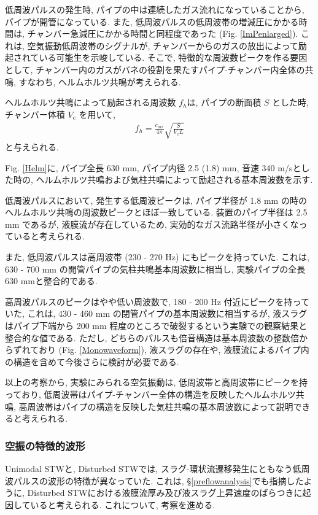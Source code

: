 \documentclass[12pt]{article}
\begin{document}
低周波パルスの発生時, パイプの中は連続したガス流れになっていることから, パイプが開管になっている.
また, 低周波パルスの低周波帯の増減圧にかかる時間は, チャンバー急減圧にかかる時間と同程度であった (Fig. \ref{ImPenlarged}). これは, 空気振動低周波帯のシグナルが, チャンバーからのガスの放出によって励起されている可能生を示唆している. そこで, 特徴的な周波数ピークを作る要因として, チャンバー内のガスがバネの役割を果たすパイプ-チャンバー内全体の共鳴, すなわち, ヘルムホルツ共鳴が考えられる.

ヘルムホルツ共鳴によって励起される周波数 $f_h$は, パイプの断面積 $S$ とした時, チャンバー体積 $V_\mathrm{c}$ を用いて,  
\begin{eqnarray}
f_{h}=\frac{c_{air}}{4\pi} \sqrt{  \frac{S}{V_\mathrm{c} L }   } \label{Helmeq}
\end{eqnarray}
と与えられる. 

Fig. \ref{Helm}に, パイプ全長 630 mm, パイプ内径 2.5 (1.8) mm, 音速 340 m/sとした時の, ヘルムホルツ共鳴および気柱共鳴によって励起される基本周波数を示す. 

低周波パルスにおいて, 発生する低周波ピークは, パイプ半径が 1.8 mm の時のヘルムホルツ共鳴の周波数ピークとほぼ一致している. 装置のパイプ半径は 2.5 mm であるが, 液膜流が存在しているため, 実効的なガス流路半径が小さくなっていると考えられる. 

また, 低周波パルスは高周波帯 (230 - 270 Hz) にもピークを持っていた. これは, 630 - 700 mm の開管パイプの気柱共鳴基本周波数に相当し, 実験パイプの全長 630 mmと整合的である. 

高周波パルスのピークはやや低い周波数で, 180 - 200 Hz 付近にピークを持っていた, これは, 430 - 460 mm の閉管パイプの基本周波数に相当するが, 液スラグはパイプ下端から 200 mm 程度のところで破裂するという実験での観察結果と整合的な値である. ただし, どちらのパルスも倍音構造は基本周波数の整数倍からずれており (Fig. \ref{Monowaveform}), 液スラグの存在や, 液膜流によるパイプ内の構造を含めて今後さらに検討が必要である.

以上の考察から, 実験にみられる空気振動は, 低周波帯と高周波帯にピークを持っており, 低周波帯はパイプ-チャンバー全体の構造を反映したヘルムホルツ共鳴, 高周波帯はパイプの構造を反映した気柱共鳴の基本周波数によって説明できると考えられる.



\subsubsection{空振の特徴的波形}
Unimodal STWと, Disturbed STWでは, スラグ-環状流遷移発生にともなう低周波パルスの波形の特徴が異なっていた. これは, \S \ref{preflowanalysis}でも指摘したように, Disturbed STWにおける液膜流厚み及び液スラグ上昇速度のばらつきに起因していると考えられる. これについて, 考察を進める.
\end{document}
